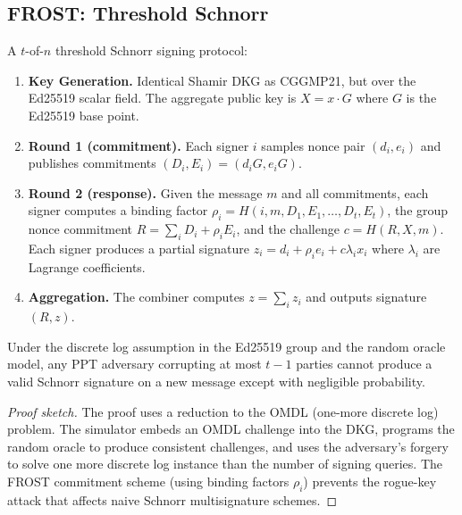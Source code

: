 \subsection{FROST: Threshold Schnorr}

\begin{definition}
A $t$-of-$n$ threshold Schnorr signing protocol:
\begin{enumerate}[nosep]
  \item \textbf{Key Generation.}  Identical Shamir DKG as CGGMP21,
        but over the Ed25519 scalar field.  The aggregate public key
        is $X = x \cdot G$ where $G$ is the Ed25519 base point.
  \item \textbf{Round 1 (commitment).}  Each signer $i$ samples
        nonce pair $(d_i, e_i)$ and publishes commitments
        $(D_i, E_i) = (d_i G, e_i G)$.
  \item \textbf{Round 2 (response).}  Given the message $m$ and
        all commitments, each signer computes a binding factor
        $\rho_i = H(i, m, D_1, E_1, \ldots, D_t, E_t)$, the group
        nonce commitment $R = \sum_i D_i + \rho_i E_i$, and the
        challenge $c = H(R, X, m)$.  Each signer produces a partial
        signature $z_i = d_i + \rho_i e_i + c \lambda_i x_i$ where
        $\lambda_i$ are Lagrange coefficients.
  \item \textbf{Aggregation.}  The combiner computes
        $z = \sum_i z_i$ and outputs signature $(R, z)$.
\end{enumerate}
\end{definition}

\begin{theorem}
\label{thm:frost-uf}
Under the discrete log assumption in the Ed25519 group and the random
oracle model, any PPT adversary corrupting at most $t-1$ parties
cannot produce a valid Schnorr signature on a new message except with
negligible probability.
\end{theorem}

\begin{proof}[Proof sketch]
The proof uses a reduction to the OMDL (one-more discrete log)
problem.  The simulator embeds an OMDL challenge into the DKG,
programs the random oracle to produce consistent challenges, and
uses the adversary's forgery to solve one more discrete log instance
than the number of signing queries.  The FROST commitment scheme
(using binding factors $\rho_i$) prevents the rogue-key attack that
affects naive Schnorr multisignature schemes.
\end{proof}

